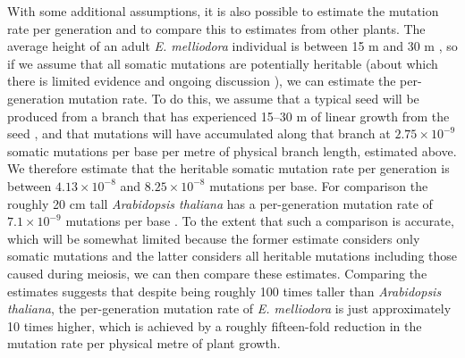 With some additional assumptions, it is also possible to estimate the mutation rate per generation and to compare this to estimates from other plants. The average height of an adult \textit{E. melliodora} individual is between 15 m and 30 m \parencite{boland_forest_2006}, so if we assume that all somatic mutations are potentially heritable (about which there is limited evidence \parencite{plomion_oak_2018} and ongoing discussion \parencite{lanfear_plants_2018}), we can estimate the per-generation mutation rate. To do this, we assume that a typical seed will be produced from a branch that has experienced 15–30 m of linear growth from the seed \parencite{boland_forest_2006}, and that mutations will have accumulated along that branch at $2.75 \times 10^{-9}$ somatic mutations per base per metre of physical branch length, estimated above. We therefore estimate that the heritable somatic mutation rate per generation is between $4.13 \times 10^{-8}$ and $8.25 \times 10^{-8}$ mutations per base. For comparison the roughly 20 cm tall \textit{Arabidopsis thaliana} has a per-generation mutation rate of $7.1 \times 10^{-9}$ mutations per base \parencite{ossowski_rate_2010}. To the extent that such a comparison is accurate, which will be somewhat limited because the former estimate considers only somatic mutations and the latter considers all heritable mutations including those caused during meiosis, we can then compare these estimates. Comparing the estimates suggests that despite being roughly 100 times taller than \textit{Arabidopsis thaliana}, the per-generation mutation rate of \textit{E. melliodora} is just approximately 10 times higher, which is achieved by a roughly fifteen-fold reduction in the mutation rate per physical metre of plant growth.

